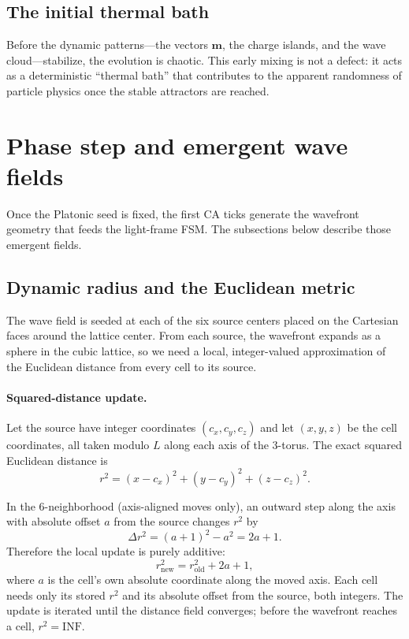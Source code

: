 \documentclass{ijuc}
\begin{document}
\subsection{The initial thermal bath}

Before the dynamic patterns---the vectors $\boldsymbol{m}$, the charge islands, and the wave cloud---stabilize, the evolution is chaotic.  This early mixing is not a defect: it acts as a deterministic ``thermal bath'' that contributes to the apparent randomness of particle physics once the stable attractors are reached.


\section{Phase step and emergent wave fields}\label{sec:phase-step}

Once the Platonic seed is fixed, the first CA ticks generate the wavefront geometry that feeds the light-frame FSM.  The subsections below describe those emergent fields.

\subsection{Dynamic radius and the Euclidean metric}

The wave field is seeded at each of the six source centers placed on the Cartesian faces around the lattice center.  From each source, the wavefront expands as a sphere in the cubic lattice, so we need a local, integer-valued approximation of the Euclidean distance from every cell to its source.

\paragraph{Squared-distance update.}
Let the source have integer coordinates $(c_{x},c_{y},c_{z})$ and let $(x,y,z)$ be the cell coordinates, all taken modulo $L$ along each axis of the 3-torus.  The exact squared Euclidean distance is
\[
r^{2}=(x-c_{x})^{2}+(y-c_{y})^{2}+(z-c_{z})^{2}.
\]

In the 6-neighborhood (axis-aligned moves only), an outward step along the axis with absolute offset $a$ from the source changes $r^{2}$ by
\[
\Delta r^{2}=(a+1)^{2}-a^{2}=2a+1.
\]
Therefore the local update is purely additive:
\[
r^{2}_{\text{new}}=r^{2}_{\text{old}}+2a+1,
\]
where $a$ is the cell's own absolute coordinate along the moved axis.  Each cell needs only its stored $r^{2}$ and its absolute offset from the source, both integers.  The update is iterated until the distance field converges; before the wavefront reaches a cell, $r^{2}=\mathrm{INF}$.
\end{document}
